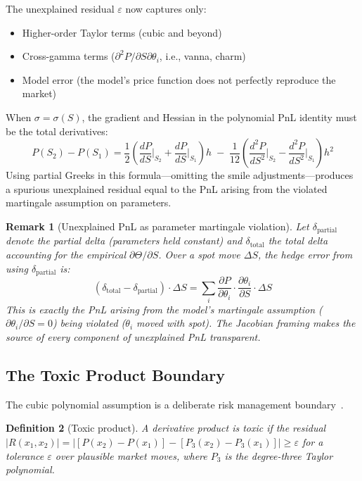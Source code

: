 \documentclass[11pt,a4paper]{article}
\newtheorem{definition}{Definition}[section]
\newtheorem{remark}[definition]{Remark}
\begin{document}
The unexplained residual $\varepsilon$ now captures only:
\begin{itemize}[nosep]
\item Higher-order Taylor terms (cubic and beyond)
\item Cross-gamma terms ($\partial^2 P / \partial S \partial \theta_i$, i.e., vanna, charm)
\item Model error (the model's price function does not perfectly reproduce the market)
\end{itemize}

When $\sigma = \sigma(S)$, the gradient and Hessian in the polynomial PnL identity must be the total derivatives:
\begin{equation}\label{eq:unified}
P(S_2) - P(S_1) = \frac{1}{2}\!\left(\frac{dP}{dS}\bigg|_{S_2} + \frac{dP}{dS}\bigg|_{S_1}\right) h \;-\; \frac{1}{12}\!\left(\frac{d^2P}{dS^2}\bigg|_{S_2} - \frac{d^2P}{dS^2}\bigg|_{S_1}\right) h^2
\end{equation}
Using partial Greeks in this formula---omitting the smile adjustments---produces a spurious unexplained residual equal to the PnL arising from the violated martingale assumption on parameters.

\begin{remark}[Unexplained PnL as parameter martingale violation]
\label{rem:unexplained-invariant}
Let $\delta_{\text{partial}}$ denote the partial delta (parameters held constant) and $\delta_{\text{total}}$ the total delta accounting for the empirical $\partial\Theta/\partial S$.  Over a spot move $\Delta S$, the hedge error from using $\delta_{\text{partial}}$ is:
\[
(\delta_{\text{total}} - \delta_{\text{partial}}) \cdot \Delta S = \sum_i \frac{\partial P}{\partial \theta_i} \cdot \frac{\partial \theta_i}{\partial S} \cdot \Delta S
\]
This is exactly the PnL arising from the model's martingale assumption ($\partial\theta_i/\partial S = 0$) being violated ($\theta_i$ moved with spot).  The Jacobian framing makes the source of every component of unexplained PnL transparent.
\end{remark}

\subsection{The Toxic Product Boundary}
\label{sec:toxic}

The cubic polynomial assumption is a deliberate risk management boundary~\cite{pnl_total_gamma}.

\begin{definition}[Toxic product]
\label{def:toxic}
A derivative product is \emph{toxic} if the residual $|R(x_1,x_2)| = |[P(x_2) - P(x_1)] - [P_3(x_2) - P_3(x_1)]| \geq \varepsilon$ for a tolerance $\varepsilon$ over plausible market moves, where $P_3$ is the degree-three Taylor polynomial.
\end{definition}
\end{document}
